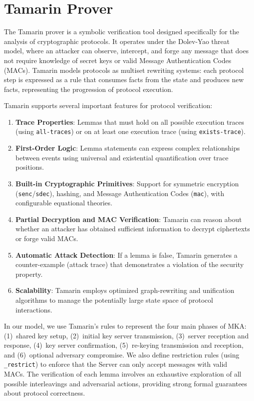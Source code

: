 \documentclass{llncs}
\begin{document}
\section{Tamarin Prover}
The Tamarin prover is a symbolic verification tool designed specifically for the analysis of cryptographic protocols. It operates under the Dolev-Yao threat model, where an attacker can observe, intercept, and forge any message that does not require knowledge of secret keys or valid Message Authentication Codes (MACs). Tamarin models protocols as multiset rewriting systems: each protocol step is expressed as a rule that consumes facts from the state and produces new facts, representing the progression of protocol execution.

Tamarin supports several important features for protocol verification:

\begin{enumerate}
\item \textbf{Trace Properties}: Lemmas that must hold on all possible execution traces (using \texttt{all-traces}) or on at least one execution trace (using \texttt{exists-trace}).

\item \textbf{First-Order Logic}: Lemma statements can express complex relationships between events using universal and existential quantification over trace positions.

\item \textbf{Built-in Cryptographic Primitives}: Support for symmetric encryption (\texttt{senc}/\texttt{sdec}), hashing, and Message Authentication Codes (\texttt{mac}), with configurable equational theories.

\item \textbf{Partial Decryption and MAC Verification}: Tamarin can reason about whether an attacker has obtained sufficient information to decrypt ciphertexts or forge valid MACs.

\item \textbf{Automatic Attack Detection}: If a lemma is false, Tamarin generates a counter-example (attack trace) that demonstrates a violation of the security property.

\item \textbf{Scalability}: Tamarin employs optimized graph-rewriting and unification algorithms to manage the potentially large state space of protocol interactions.
\end{enumerate}

In our model, we use Tamarin's rules to represent the four main phases of MKA: (1)~shared key setup, (2)~initial key server transmission, (3)~server reception and response, (4)~key server confirmation, (5)~re-keying transmission and reception, and (6)~optional adversary compromise. We also define restriction rules (using \texttt{\_restrict}) to enforce that the Server can only accept messages with valid MACs. The verification of each lemma involves an exhaustive exploration of all possible interleavings and adversarial actions, providing strong formal guarantees about protocol correctness.
\end{document}
